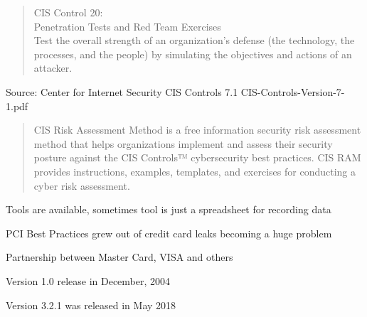 \documentclass[Screen16to9,17pt]{foils}
\begin{document}
\begin{quote}
CIS Control 20:\\
Penetration Tests and Red Team Exercises\\
Test the overall strength of an organization’s defense (the technology, the processes, and the people) by simulating the objectives and actions of an attacker.
\end{quote}

\begin{list1}
\item
\item
\item
\item
\end{list1}

Source: Center for Internet Security CIS Controls 7.1 CIS-Controls-Version-7-1.pdf


\begin{quote}
CIS Risk Assessment Method is a free information security risk assessment method that helps organizations implement and assess their security posture against the CIS Controls™ cybersecurity best practices. CIS RAM provides instructions, examples, templates, and exercises for conducting a cyber risk assessment.
\end{quote}

\begin{list1}
\item Tools are available, sometimes tool is just a spreadsheet for recording data
\item
\item
\item
\end{list1}







\begin{list1}
\item PCI Best Practices grew out of credit card leaks becoming a huge problem
\item Partnership between Master Card, VISA and others
\item Version  1.0 release in December, 2004
\item Version 3.2.1 was released in May 2018\\ 
\end{list1}
\end{document}
